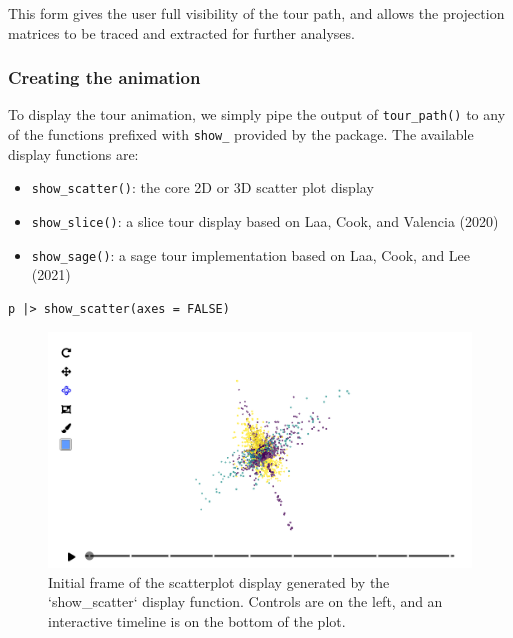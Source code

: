 This form gives the user full visibility of the tour path, and allows the projection matrices to be traced and extracted for further analyses.

\hypertarget{creating-the-animation}{%
\subsubsection{Creating the animation}\label{creating-the-animation}}

To display the tour animation, we simply pipe the output of \texttt{tour\_path()} to any of the functions prefixed with \texttt{show\_} provided by the  package. The available display functions are:

\begin{itemize}
\tightlist
\item
  \texttt{show\_scatter()}: the core 2D or 3D scatter plot display
\item
  \texttt{show\_slice()}: a slice tour display based on Laa, Cook, and Valencia (2020)
\item
  \texttt{show\_sage()}: a sage tour implementation based on Laa, Cook, and Lee (2021)
\end{itemize}

\begin{verbatim}
p |> show_scatter(axes = FALSE)
\end{verbatim}

\begin{figure}
\includegraphics[width=\textwidth]{figures/implementation/pdfsense_scatter_3d} \caption{Initial frame of the scatterplot display generated by the `show\_scatter` display function. Controls are on the left, and an interactive timeline is on the bottom of the plot.}\label{fig:scatter-display-static}
\end{figure}


